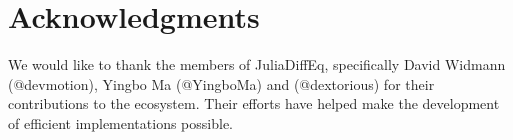 \documentclass{article}
\begin{document}
\section*{Acknowledgments}

We would like to thank the members of JuliaDiffEq, specifically David Widmann (@devmotion),
Yingbo Ma (@YingboMa) and (@dextorious) for their contributions to the ecosystem. Their efforts
have helped make the development of efficient implementations possible.



\end{document}
